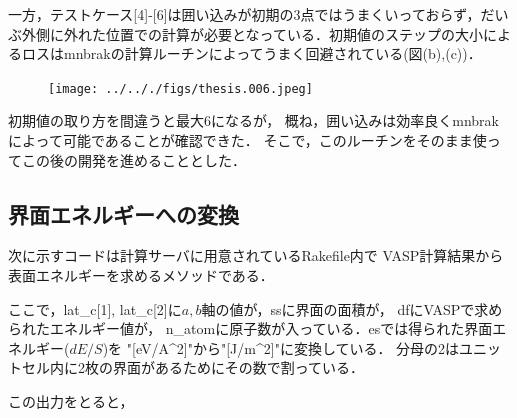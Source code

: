 一方，テストケース{[}4{]}-{[}6{]}は囲い込みが初期の3点ではうまくいっておらず，だいぶ外側に外れた位置での計算が必要となっている．初期値のステップの大小によるロスはmnbrakの計算ルーチンによってうまく回避されている(図(b),(c))．

\begin{figure}[H]
\centering
\begin{center}
\texttt{[image: ../.././figs/thesis.006.jpeg]}
\end{center}
\caption{{}}

\label{fig:}
\end{figure}

初期値の取り方を間違うと最大6になるが，
概ね，囲い込みは効率良くmnbrakによって可能であることが確認できた．
そこで，このルーチンをそのまま使ってこの後の開発を進めることとした．

    \subsection{界面エネルギーへの変換}\label{ux754cux9762ux30a8ux30cdux30ebux30aeux30fcux3078ux306eux5909ux63db}

次に示すコードは計算サーバに用意されているRakefile内で
VASP計算結果から表面エネルギーを求めるメソッドである．

\begin{Shaded}
\begin{Highlighting}[]
\NormalTok{)}
\NormalTok{)[}\NormalTok{][}\NormalTok{].to_f}
\NormalTok{  ss = lat_c[}\NormalTok{] * lat_c[}\NormalTok{]}
\NormalTok{ * }\NormalTok{ / }
\end{Highlighting}
\end{Shaded}

ここで，lat\_c{[}1{]},
lat\_c{[}2{]}に\(a,b\)軸の値が，ssに界面の面積が，
dfにVASPで求められたエネルギー値が，
n\_atomに原子数が入っている．esでは得られた界面エネルギー(\(dE/S\))を
"{[}eV/A\^{}2{]}"から"{[}J/m\^{}2{]}"に変換している．
分母の2はユニットセル内に2枚の界面があるためにその数で割っている．

この出力をとると，

